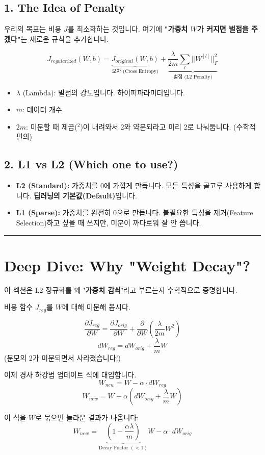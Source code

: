 \documentclass[11pt,a4paper]{book}
\theoremstyle{definition}
\begin{document}
\subsection{1. The Idea of Penalty}
우리의 목표는 비용 $J$를 최소화하는 것입니다. 여기에 \textbf{"가중치 $W$가 커지면 벌점을 주겠다"}는 새로운 규칙을 추가합니다.

$$ J_{regularized}(W, b) = \underbrace{J_{original}(W, b)}_{\text{오차 (Cross Entropy)}} + \underbrace{\frac{\lambda}{2m} \sum_{l} ||W^{[l]}||_F^2}_{\text{벌점 (L2 Penalty)}} $$

\begin{itemize}
    \item $\lambda$ (Lambda): 벌점의 강도입니다. 하이퍼파라미터입니다.
    \item $m$: 데이터 개수.
    \item $2m$: 미분할 때 제곱($^2$)이 내려와서 2와 약분되라고 미리 2로 나눠둡니다. (수학적 편의)
\end{itemize}

\subsection{2. L1 vs L2 (Which one to use?)}
\begin{itemize}
    \item \textbf{L2 (Standard):} 가중치를 0에 가깝게 만듭니다. 모든 특성을 골고루 사용하게 합니다. \textbf{딥러닝의 기본값(Default)}입니다.
    \item \textbf{L1 (Sparse):} 가중치를 완전히 0으로 만듭니다. 불필요한 특성을 제거(Feature Selection)하고 싶을 때 쓰지만, 미분이 까다로워 잘 안 씁니다.
\end{itemize}

\vspace{0.5cm}\hrule\vspace{0.5cm}

\section{Deep Dive: Why "Weight Decay"?}

이 섹션은 L2 정규화를 왜 \textbf{'가중치 감쇠'}라고 부르는지 수학적으로 증명합니다.

\begin{mathbox}[title={역전파 수식 유도}]
비용 함수 $J_{reg}$를 $W$에 대해 미분해 봅시다.

$$ \frac{\partial J_{reg}}{\partial W} = \frac{\partial J_{orig}}{\partial W} + \frac{\partial}{\partial W} \left( \frac{\lambda}{2m} W^2 \right) $$
$$ dW_{reg} = dW_{orig} + \frac{\lambda}{m} W $$
(분모의 2가 미분되면서 사라졌습니다!)

이제 경사 하강법 업데이트 식에 대입합니다.
$$ W_{new} = W - \alpha \cdot dW_{reg} $$
$$ W_{new} = W - \alpha \left( dW_{orig} + \frac{\lambda}{m} W \right) $$

이 식을 $W$로 묶으면 놀라운 결과가 나옵니다:
$$ W_{new} = \underbrace{\left( 1 - \frac{\alpha \lambda}{m} \right)}_{\text{Decay Factor } (< 1)} W - \alpha \cdot dW_{orig} $$
\end{mathbox}
\end{document}
